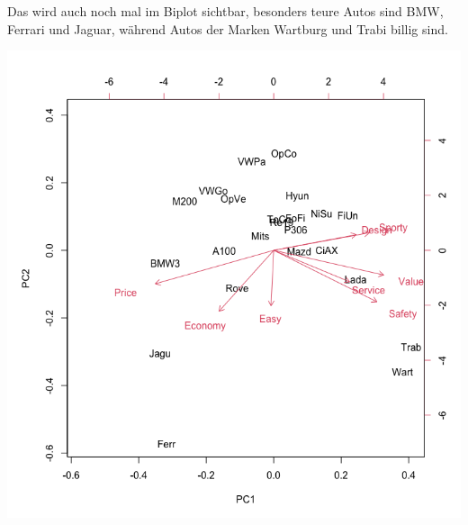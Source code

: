 \documentclass{article}
\begin{document}
	Das wird auch noch mal im Biplot sichtbar, besonders teure Autos sind BMW, Ferrari und Jaguar, während Autos der Marken Wartburg und Trabi billig sind.
	\begin{center}
		\includegraphics[scale=0.3]{2_1_biplot}
	\end{center}
\end{document}
